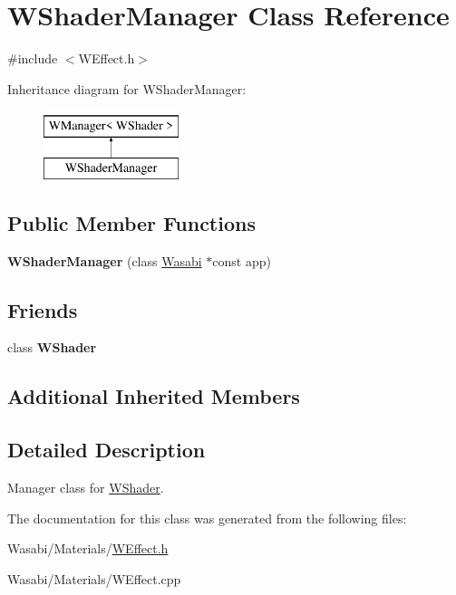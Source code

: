 \hypertarget{class_w_shader_manager}{}\section{W\+Shader\+Manager Class Reference}
\label{class_w_shader_manager}


{\ttfamily \#include $<$W\+Effect.\+h$>$}

Inheritance diagram for W\+Shader\+Manager\+:\begin{figure}[H]
\begin{center}
\leavevmode
\includegraphics[height=2.000000cm]{class_w_shader_manager}
\end{center}
\end{figure}
\subsection*{Public Member Functions}
\begin{DoxyCompactItemize}
\item 
{\bfseries W\+Shader\+Manager} (class \hyperlink{class_wasabi}{Wasabi} $\ast$const app)\hypertarget{class_w_shader_manager_ada06146dd9fb0fbcf6e3d023004fdc66}{}\label{class_w_shader_manager_ada06146dd9fb0fbcf6e3d023004fdc66}

\end{DoxyCompactItemize}
\subsection*{Friends}
\begin{DoxyCompactItemize}
\item 
class {\bfseries W\+Shader}\hypertarget{class_w_shader_manager_a8d00ec6947471c8645472002a3d81cdc}{}\label{class_w_shader_manager_a8d00ec6947471c8645472002a3d81cdc}

\end{DoxyCompactItemize}
\subsection*{Additional Inherited Members}


\subsection{Detailed Description}
Manager class for \hyperlink{class_w_shader}{W\+Shader}. 

The documentation for this class was generated from the following files\+:\begin{DoxyCompactItemize}
\item 
Wasabi/\+Materials/\hyperlink{_w_effect_8h}{W\+Effect.\+h}\item 
Wasabi/\+Materials/W\+Effect.\+cpp\end{DoxyCompactItemize}

